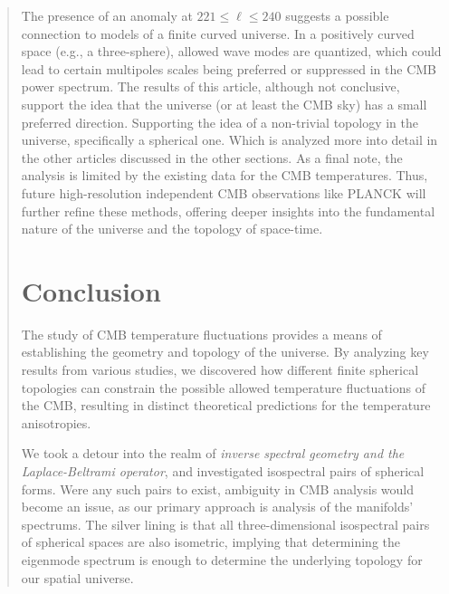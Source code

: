 \documentclass{article}
\theoremstyle{definition}
\begin{document}
\begin{abstract}
The presence of an anomaly at $221 \leq \ell \leq 240$ suggests a possible connection to models of a finite curved universe. In a positively curved space (e.g., a three-sphere), allowed wave modes are quantized, which could lead to certain multipoles scales being preferred or suppressed in the CMB power spectrum.
The results of this article, although not conclusive, support the idea that the universe (or at least the CMB sky) has a small preferred direction. Supporting the idea of a non-trivial topology in the universe, specifically a spherical one. Which is analyzed more into detail in the other articles discussed in the other sections.
As a final note, the analysis is limited by the existing data for the CMB temperatures. Thus, future high-resolution independent CMB observations like PLANCK will further refine these methods, offering deeper insights into the fundamental nature of the universe and the topology of space-time.


\section{Conclusion}
%

The study of CMB temperature fluctuations provides a means of establishing the geometry and topology of the universe. By analyzing key results from various studies, we discovered how different finite spherical topologies can constrain the possible allowed temperature fluctuations of the CMB, resulting in distinct theoretical predictions for the temperature anisotropies.

We took a detour into the realm of \emph{inverse spectral geometry and the Laplace-Beltrami operator}, and investigated isospectral pairs of spherical forms. Were any such pairs to exist, ambiguity in CMB analysis would become an issue, as our primary approach is analysis of the manifolds' spectrums. The silver lining is that all three-dimensional isospectral pairs of spherical spaces are also isometric, implying that determining the eigenmode spectrum is enough to determine the underlying topology for our spatial universe.


\end{abstract}
\end{document}
